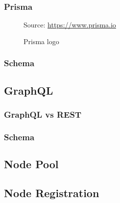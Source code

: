 \subsubsection{Prisma}
\label{subsubsec:implementation_server_database_prisma}

\begin{figure} %
  \centering
  \def\stackalignment{r} %
  {\scriptsize \parbox[t]{\linewidth}{ Source: \url{https://www.prisma.io}} }
  \caption{Prisma logo}
\end{figure}

\subsubsection{Schema}
\label{subsubsec:implementation_server_database_schema}

\subsection{GraphQL}
\label{subsec:implementation_server_graphql}

\subsubsection{GraphQL vs REST}
\label{subsubsec:implementation_server_graphql_graphql_vs_rest}

\subsubsection{Schema}
\label{subsubsec:implementation_server_graphql_schema}

\subsection{Node Pool}
\label{subsec:implementation_server_node_pool}

\subsection{Node Registration}
\label{subsec:implementation_server_node_registration}

